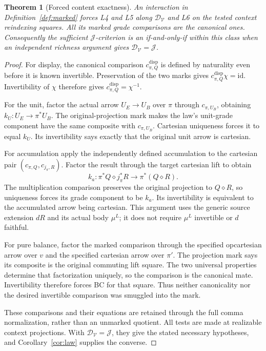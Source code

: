 \documentclass[11pt,a4paper]{article}
\newtheorem{theorem}{Theorem}[section]
\theoremstyle{definition}
\newcommand{\V}{\mathcal V}
\newcommand{\J}{\mathcal J}
\newcommand{\D}{\mathcal D_{\V}}
\newcommand{\id}{\mathrm{id}}
\newcommand{\diamondc}{\mathbin{\diamond}}
\begin{document}
\begin{theorem}[Forced content exactness]\label{thm:recognition}
An interaction in Definition~\ref{def:marked} forces L4 and L5 along $\D$ and
L6 on the tested context reindexing squares. All its marked grade comparisons
are the canonical ones. Consequently the sufficient $\J$-criterion is an
if-and-only-if within this class when an independent richness argument gives
$\D=\J$.
\end{theorem}
\begin{proof}
For display, the canonical comparison $c^{\mathrm{disp}}_{\pi,Q}$ is defined
by naturality even before it is known invertible. Preservation of the two
marks gives $c^{\mathrm{disp}}_{\pi,Q}\chi=\id$. Invertibility of $\chi$
therefore gives $c^{\mathrm{disp}}_{\pi,Q}=\chi^{-1}$.

For the unit, factor the actual arrow $U_E\to U_B$ over $\pi$ through
$c_{\pi,U_B}$, obtaining $k_U:U_E\to\pi^*U_B$. The original-projection mark
makes the law's unit-grade component have the same composite with
$c_{\pi,U_B}$. Cartesian uniqueness forces it to equal $k_U$. Its
invertibility says exactly that the original unit arrow is cartesian.

For accumulation apply the independently defined accumulation to the cartesian
pair $(c_{\pi,Q},c_{j_\pi,R})$. Factor the result through the target cartesian
lift to obtain
\[
 k_a:\pi^*Q\diamondc j_\pi^*R\longrightarrow\pi^*(Q\diamondc R).
\]
The multiplication comparison preserves the original projection to
$Q\diamondc R$, so uniqueness forces its grade component to be $k_a$.
Its invertibility is equivalent to the accumulated arrow being cartesian.
This argument uses the generic source extension $dR$ and its actual body
$\mu^L$; it does not require $\mu^L$ invertible or $d$ faithful.

For pure balance, factor the marked comparison through the specified
opcartesian arrow over $v$ and the specified cartesian arrow over $\pi'$.
The projection mark says its composite is the original commuting lift square.
The two universal properties determine that factorization uniquely, so the
comparison is the canonical mate. Invertibility therefore forces BC for that
square. Thus neither canonicality nor the desired invertible comparison was
smuggled into the mark.

These comparisons and their equations are retained through the full comma
normalization, rather than an unmarked quotient. All tests are made at
realizable context projections. With $\D=\J$, they give the stated necessary
hypotheses, and Corollary~\ref{cor:law} supplies the converse.
\end{proof}
\end{document}
